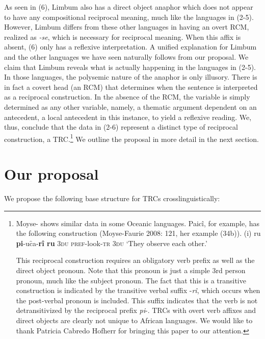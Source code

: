 \documentclass[output=paper]{langsci/langscibook}
\begin{document}
As seen in (6), Limbum also has a direct object anaphor which does not appear to have any compositional reciprocal meaning, much like the languages in (2-5). However, Limbum differs from these other languages in having an overt RCM, realized as \textit{-se}, which is necessary for reciprocal meaning. When this affix is absent, (6) only has a reflexive interpretation. A unified explanation for Limbum and the other languages we have seen naturally follows from our proposal. We claim that Limbum reveals what is actually happening in the languages in (2-5). In those languages, the polysemic nature of the anaphor is only illusory. There is in fact a covert head (an RCM) that determines when the sentence is interpreted as a reciprocal construction. In the absence of the RCM, the variable is simply determined as any other variable, namely, a thematic argument dependent on an antecedent, a local antecedent in this instance, to yield a reflexive reading. We, thus, conclude that the data in (2-6) represent a distinct type of reciprocal construction, a TRC.\footnote{ Moyse-\citet{Faurie2008} shows similar data in some Oceanic languages. Paicî, for example, has the following construction (Moyse-Faurie 2008: 121, her example (34b)).
(i)  ru  \textbf{pi}-uc̑a-\textbf{rî  ru}
 \textsc{3du}  \textsc{pref}-look-\textsc{tr}  \textsc{3du}
  ‘They observe each other.’

This reciprocal construction requires an obligatory verb prefix as well as the direct object pronoun. Note that this pronoun is just a simple 3rd person pronoun, much like the subject pronoun. The fact that this is a transitive construction is indicated by the transitive verbal suffix -\textit{rî}, which occurs when the post-verbal pronoun is included. This suffix indicates that the verb is not detransitivized by the reciprocal prefix \textit{pi}-. TRCs with overt verb affixes and direct objects are clearly not unique to African languages. We would like to thank Patricia Cabredo Hofherr for bringing this paper to our attention.}\textstyleCommentReference{} We outline the proposal in more detail in the next section.

\section{Our proposal} 

We propose the following base structure for TRCs crosslinguistically:

 
\end{document}

